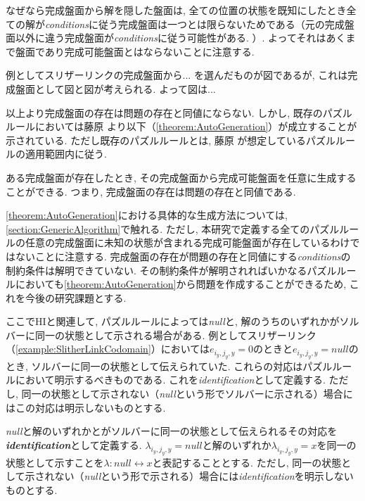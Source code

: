なぜなら完成盤面から解を隠した盤面は, 全ての位置の状態を既知にしたとき全ての解が\textit{conditions}に従う完成盤面は一つとは限らないためである（元の完成盤面以外に違う完成盤面が\textit{conditions}に従う可能性がある. ）. よってそれはあくまで盤面であり完成可能盤面とはならないことに注意する.
\begin{example}
  例としてスリザーリンクの完成盤面から... を選んだものが図であるが, これは完成盤面として図と図が考えられる. よって図は...
\end{example}
以上より完成盤面の存在は問題の存在と同値にならない. しかし, 既存のパズルルールにおいては藤原 \cite{Fujiwara2022}より以下（\cref{theorem:AutoGeneration}）が成立することが示されている. ただし既存のパズルルールとは, 藤原 \cite{Fujiwara2022}が想定しているパズルルールの適用範囲内に従う.
\begin{theorem}\label{theorem:AutoGeneration}
  ある完成盤面が存在したとき, その完成盤面から完成可能盤面を任意に生成することができる. つまり, 完成盤面の存在は問題の存在と同値である.
\end{theorem}
\cref{theorem:AutoGeneration}における具体的な生成方法については, \cref{section:GenericAlgorithm}で触れる. ただし, 本研究で定義する全てのパズルルールの任意の完成盤面に未知の状態が含まれる完成可能盤面が存在しているわけではないことに注意する. 完成盤面の存在が問題の存在と同値にする\textit{conditions}の制約条件は解明できていない. その制約条件が解明されればいかなるパズルルールにおいても\cref{theorem:AutoGeneration}から問題を作成することができるため, これを今後の研究課題とする.

ここでHIと関連して, パズルルールによっては\textit{null}と, 解のうちのいずれかがソルバーに同一の状態として示される場合がある. 例としてスリザーリンク（\cref{example:SlitherLinkCodomain}）においては$e_{i_y,j_y,y} = 0$のときと$e_{i_y,j_y,y}=\textit{null}$のとき, ソルバーに同一の状態として伝えられていた. これらの対応はパズルルールにおいて明示するべきものである. これを\textit{identification}として定義する. ただし, 同一の状態として示されない（\textit{null}という形でソルバーに示される）場合にはこの対応は明示しないものとする.

\begin{definition}\label{definition:Identification}
  \textit{null}と解のいずれかとがソルバーに同一の状態として伝えられるその対応を\textbf{\textit{identification}}として定義する.
  $\lambda_{i_y,j_y,y}=\textit{null}$と解のいずれか$\lambda_{i_y,j_y,y}=x$を同一の状態として示すことを$\lambda\colon\textit{null}\leftrightarrow x$と表記することとする.
  ただし, 同一の状態として示されない（\textit{null}という形で示される）場合には\textit{identification}を明示しないものとする.
\end{definition}

